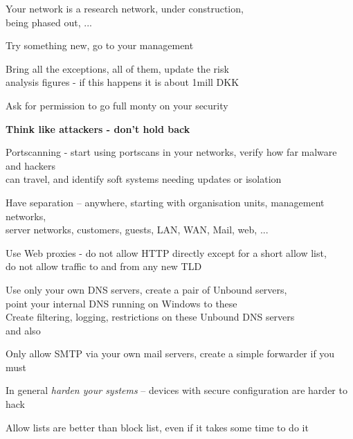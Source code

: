 \documentclass[Screen16to9,17pt]{foils}
\begin{document}
Your network is a research network, under construction, \\
being phased out, ...

Try something new, go to your management

Bring all the exceptions, all of them, update the risk \\
analysis figures - if this happens it is about 1mill DKK

Ask for permission to go full monty on your security

{\bf Think like attackers - don't hold back}






\begin{list2}
\item Portscanning - start using portscans in your networks, verify how far malware and hackers\\
 can travel, and identify soft systems needing updates or isolation
\item Have separation -- anywhere, starting with organisation units, management networks,\\
server networks, customers, guests, LAN, WAN, Mail, web, ...
\item Use Web proxies - do not allow HTTP directly except for a short allow list, \\
do not allow traffic to and from any new TLD
\item Use only your own DNS servers, create a pair of Unbound servers, \\
point your internal DNS running on Windows to these\\
Create filtering, logging, restrictions on these Unbound DNS servers\\
 and also 
\item Only allow SMTP via your own mail servers, create a simple forwarder if you must
\item In general \emph{harden your systems} -- devices with secure configuration are harder to hack
\end{list2}

Allow lists are better than block list, even if it takes some time to do it


\end{document}
